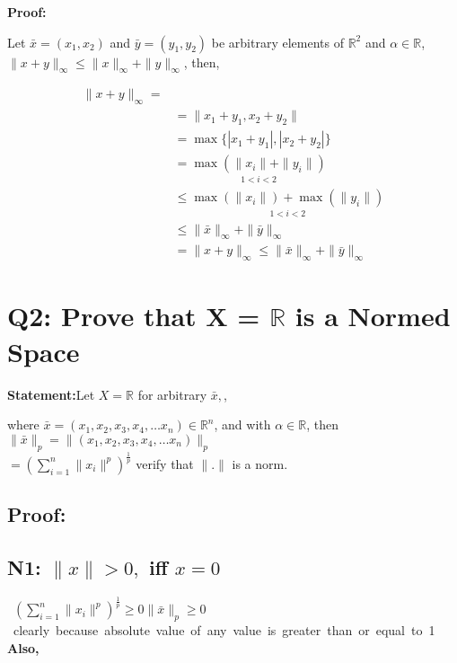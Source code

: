 \documentclass[12pt]{article}
\begin{document}
\textbf{Proof:}

Let $\bar{x} = (x_{1}, x_{2})$ and $\bar{y} = (y_{1}, y_{2})$ be arbitrary elements of $\mathbb{R}^{2}$ and $\alpha \in \mathbb{R}$,
\newline
$\| x+ y \|_{\infty} \leq  \| x \|_{\infty} + \|y\|_{\infty} $, then,


\begin{center}
    \begin{eqnarray*}
      \| x+ y \|_{\infty} =\\
      & = \|x_{1} + y_{1},x_{2} + y_{2}\| \\
      & = \max\{|x_{1} + y_{1}|, |x_{2} + y_{2}|\} \\
      & = \underset{1 < i < 2}{\max(\| x_i \| + \| y_i \|)} \\
      & \leq  \underset{1 < i < 2}{\max(\| x_i \|) + \max(\| y_i \|)} \\
      & \leq  \|\bar{x}\|_{\infty} + \|\bar{y}\|_{\infty} \\
      & = \| x + y \|_{\infty} \leq \|\bar{x}\|_{\infty} + \|\bar{y}\|_{\infty}
    \end{eqnarray*}
\end{center}


\section*{Q2: Prove that X = $\mathbb{R}$ is a Normed Space}

\textbf{Statement:}Let $X = \mathbb{R}$ for arbitrary $\bar{x},$,

where $\bar{x} = (x_{1}, x_{2},x_{3}, x_{4},\dots x_{n}) \in \mathbb{R}^{n}$, and with $\alpha \in \mathbb{R}$, then $\| \bar{x}\|_{p} = \|(x_{1}, x_{2},x_{3}, x_{4},\dots x_{n})\|_{p}$ \\
$ = (\sum_{i = 1}^{n} \|x_{i}\|^{p})^{\frac{1}{p}}$
verify that $ \|.\|$ is a norm. \\

\subsection*{\textbf{Proof:}}




\subsection*{N1: $ \|x\| > 0,$ iff $x = 0$} 

\hbox{
  $(\sum_{i = 1}^{n} \|x_{i}\|^{p})^{\frac{1}{p}} \geq 0$ \\$\| \bar{x}\|_{p} \geq 0$ clearly because absolute value of any value is greater than or equal to 1
   \\

}
\textbf{Also,}
\end{document}
